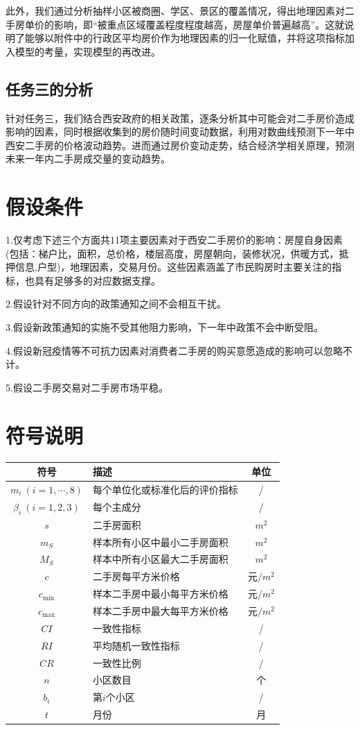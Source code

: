 \documentclass[withoutpreface,bwprint]{cumcmthesis} %
\begin{document}
此外，我们通过分析抽样小区被商圈、学区、景区的覆盖情况，得出地理因素对二手房单价的影响，即“被重点区域覆盖程度程度越高，房屋单价普遍越高”。这就说明了能够以附件中的行政区平均房价作为地理因素的归一化赋值，并将这项指标加入模型的考量，实现模型的再改进。

\subsection{任务三的分析}
针对任务三，我们结合西安政府的相关政策，逐条分析其中可能会对二手房价造成影响的因素，同时根据收集到的房价随时间变动数据，利用对数曲线预测下一年中西安二手房的价格波动趋势。进而通过房价变动走势，结合经济学相关原理，预测未来一年内二手房成交量的变动趋势。

\section{假设条件}
1.仅考虑下述三个方面共11项主要因素对于西安二手房价的影响：房屋自身因素(包括：梯户比，面积，总价格，楼层高度，房屋朝向，装修状况，供暖方式，抵押信息,户型)，地理因素，交易月份。这些因素涵盖了市民购房时主要关注的指标，也具有足够多的对应数据支撑。

2.假设针对不同方向的政策通知之间不会相互干扰。

3.假设新政策通知的实施不受其他阻力影响，下一年中政策不会中断受阻。

4.假设新冠疫情等不可抗力因素对消费者二手房的购买意愿造成的影响可以忽略不计。

5.假设二手房交易对二手房市场平稳。
\section{符号说明}
\begin{table}[H]
    \centering\small
    \begin{tabular}{cp{8cm}<{\centering}c}
    \toprule
    符号 & 描述 & 单位\\
    \midrule
        $m_i\ (i=1,\cdots,8)$ & 每个单位化或标准化后的评价指标 & / \\
        $\beta_i\ (i=1,2,3)$ & 每个主成分 & /\\
        $s$ & 二手房面积 & $m^2$\\
        $m_S$ & 样本所有小区中最小二手房面积 & $m^2$\\
        $M_S$ & 样本中所有小区最大二手房面积 & $m^2$\\
        $c$ & 二手房每平方米价格 & 元$/m^2$\\
        $c_{\min}$ & 样本二手房中最小每平方米价格 &元$/m^2$\\
        $c_{\max}$ & 样本二手房中最大每平方米价格 & 元$/m^2$\\
        $CI$ & 一致性指标 & /\\
        $RI$ & 平均随机一致性指标 & /\\
        $CR$ & 一致性比例 & /\\
        $n$ & 小区数目 & 个\\
        $b_i$ & 第$i$个小区 & /\\
        $t$ & 月份 & 月\\
    \bottomrule
    \end{tabular}
\end{table}
\end{document}
